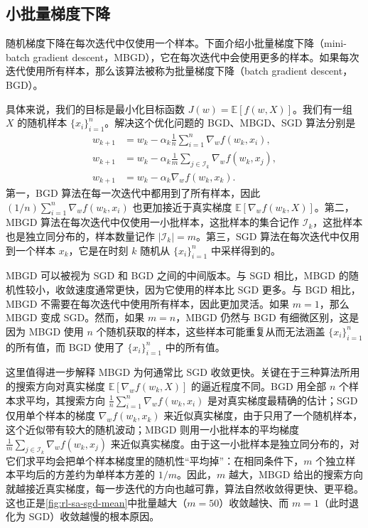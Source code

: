 \subsection{小批量梯度下降}
\label{sec:rl-sa-mbgd}

随机梯度下降在每次迭代中仅使用一个样本。下面介绍小批量梯度下降（mini-batch gradient descent，MBGD），它在每次迭代中会使用更多的样本。如果每次迭代使用所有样本，那么该算法被称为批量梯度下降（batch gradient descent，BGD）。

具体来说，我们的目标是最小化目标函数 $J(w) = \mathbb{E}[f(w, X)]$。我们有一组 $X$ 的随机样本 $\{x_i\}_{i=1}^n$。解决这个优化问题的 BGD、MBGD、SGD 算法分别是
\begin{align}
w_{k+1} &= w_k - \alpha_k \frac{1}{n} \sum_{i=1}^{n} \nabla_w f(w_k, x_i), \tag{BGD} \\
w_{k+1} &= w_k - \alpha_k \frac{1}{m} \sum_{j \in \mathcal{I}_k} \nabla_w f(w_k, x_j), \tag{MBGD} \\
w_{k+1} &= w_k - \alpha_k \nabla_w f(w_k, x_k). \tag{SGD}
\end{align}
第一，BGD 算法在每一次迭代中都用到了所有样本，因此 $(1/n) \sum_{i=1}^{n} \nabla_w f(w_k, x_i)$ 也更加接近于真实梯度 $\mathbb{E}[\nabla_w f(w_k, X)]$。第二，MBGD 算法在每次迭代中仅使用一小批样本，这批样本的集合记作 $\mathcal{I}_k$，这批样本也是独立同分布的，样本数量记作 $|\mathcal{I}_k| = m$。第三，SGD 算法在每次迭代中仅用到一个样本 $x_k$，它是在时刻 $k$ 随机从 $\{x_i\}_{i=1}^n$ 中采样得到的。

MBGD 可以被视为 SGD 和 BGD 之间的中间版本。与 SGD 相比，MBGD 的随机性较小，收敛速度通常更快，因为它使用的样本比 SGD 更多。与 BGD 相比，MBGD 不需要在每次迭代中使用所有样本，因此更加灵活。如果 $m = 1$，那么 MBGD 变成 SGD。然而，如果 $m = n$，MBGD 仍然与 BGD 有细微区别，这是因为 MBGD 使用 $n$ 个随机获取的样本，这些样本可能重复从而无法涵盖 $\{x_i\}_{i=1}^n$ 的所有值，而 BGD 使用了 $\{x_i\}_{i=1}^n$ 中的所有值。

这里值得进一步解释 MBGD 为何通常比 SGD 收敛更快。关键在于三种算法所用的搜索方向对真实梯度 $\mathbb{E}[\nabla_w f(w_k, X)]$ 的逼近程度不同。BGD 用全部 $n$ 个样本求平均，其搜索方向 $\frac{1}{n}\sum_{i=1}^{n}\nabla_w f(w_k, x_i)$ 是对真实梯度最精确的估计；SGD 仅用单个样本的梯度 $\nabla_w f(w_k, x_k)$ 来近似真实梯度，由于只用了一个随机样本，这个近似带有较大的随机波动；MBGD 则用一小批样本的平均梯度 $\frac{1}{m}\sum_{j\in\mathcal{I}_k}\nabla_w f(w_k, x_j)$ 来近似真实梯度。由于这一小批样本是独立同分布的，对它们求平均会把单个样本梯度里的随机性“平均掉”：在相同条件下，$m$ 个独立样本平均后的方差约为单样本方差的 $1/m$。因此，$m$ 越大，MBGD 给出的搜索方向就越接近真实梯度，每一步迭代的方向也越可靠，算法自然收敛得更快、更平稳。这也正是\cref{fig:rl-sa-sgd-mean}中批量越大（$m = 50$）收敛越快、而 $m = 1$（此时退化为 SGD）收敛越慢的根本原因。

